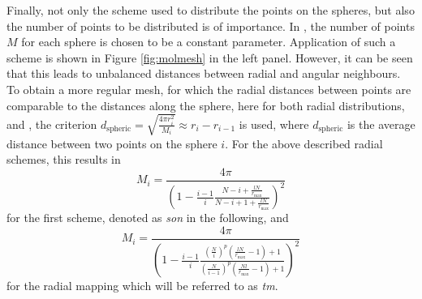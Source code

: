 %
Finally, not only the scheme used to distribute the points on the spheres, but also the number of points to be distributed is of importance.
In \cite{Son_Chu0}, the number of points $M$ for each sphere is chosen to be a constant parameter.
Application of such a scheme is shown in Figure \ref{fig:molmesh} in the left panel.
However, it can be seen that this leads to unbalanced distances between radial and angular neighbours.
To obtain a more regular mesh, for which the radial distances between points are comparable to the distances along the sphere, here for both radial distributions,  and , the criterion $d_\text{spheric}=\sqrt{\frac{4\pi r_i^2}{M_i}}\approx r_i-r_{i-1}$ is used, where $d_\text{spheric}$ is the average distance between two points on the sphere $i$.
For the above described radial schemes, this results in 
\begin{equation}\label{eq:tm_num}
M_i= \frac{4\pi}{ \left(1-\frac{i-1 }{i}\frac{N-i+\frac{lN}{r_\text{max}}}{N-i+1+\frac{lN}{r_\text{max}}}\right)^2 }
\end{equation}
for the first scheme, denoted as \textit{son} in the following, and 
\begin{equation} \label{eq:son_num}
M_i= \frac{4\pi}{\left(1-\frac{i-1 }{i}\frac{ (\frac{N}{i})^p \left(\frac{lN}{r_\text{max}}-1\right)+1}{ (\frac{N}{i-1})^p\left( \frac{Nl}{r_\text{max}} -1 \right) +1 } \right)^2 }
\end{equation}
for the radial mapping  which will be referred to as \textit{tm}.

